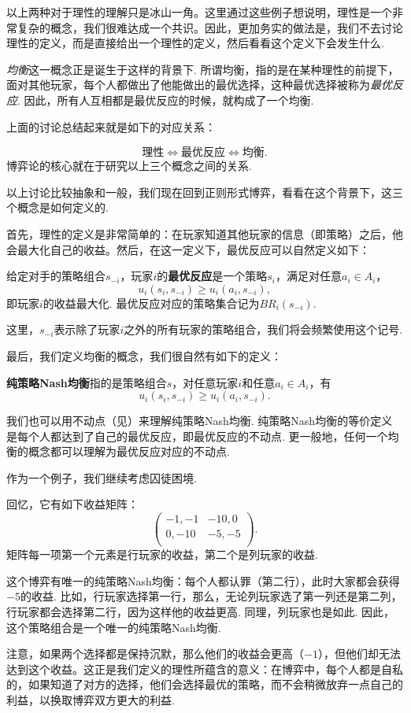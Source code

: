以上两种对于理性的理解只是冰山一角。这里通过这些例子想说明，理性是一个非常复杂的概念，我们很难达成一个共识。因此，更加务实的做法是，我们不去讨论理性的定义，而是直接给出一个理性的定义，然后看看这个定义下会发生什么.

\emph{均衡}这一概念正是诞生于这样的背景下. 所谓均衡，指的是在某种理性的前提下，面对其他玩家，每个人都做出了他能做出的最优选择，这种最优选择被称为\emph{最优反应}. 因此，所有人互相都是最优反应的时候，就构成了一个均衡.

上面的讨论总结起来就是如下的对应关系：

\[
\text{理性}\iff\text{最优反应}\iff\text{均衡}.
\]
博弈论的核心就在于研究以上三个概念之间的关系.

以上讨论比较抽象和一般，我们现在回到正则形式博弈，看看在这个背景下，这三个概念是如何定义的.

首先，理性的定义是非常简单的：在玩家知道其他玩家的信息（即策略）之后，他会最大化自己的收益。然后，在这一定义下，最优反应可以自然定义如下：

\begin{definition}[最优反应]
给定对手的策略组合$s_{-i}$，玩家$i$的\textbf{最优反应}是一个策略$s_i$，满足对任意$a_i\in A_i$，
    \[u_i(s_i,s_{-i})\geq u_i(a_i,s_{-i}),\]
即玩家$i$的收益最大化. 最优反应对应的策略集合记为$BR_i(s_{-i})$.
\end{definition}
这里，$s_{-i}$表示除了玩家$i$之外的所有玩家的策略组合，我们将会频繁使用这个记号.

最后，我们定义均衡的概念，我们很自然有如下的定义：

\begin{definition}[纯策略Nash均衡]
\textbf{纯策略Nash均衡}指的是策略组合$s$，对任意玩家$i$和任意$a_i\in A_i$，有
    \[u_i(s_i,s_{-i})\geq u_i(a_i,s_{-i}).\]
\end{definition}

我们也可以用不动点（见）来理解纯策略Nash均衡. 纯策略Nash均衡的等价定义是每个人都达到了自己的最优反应，即最优反应的不动点. 更一般地，任何一个均衡的概念都可以理解为最优反应对应的不动点.

作为一个例子，我们继续考虑囚徒困境.
\begin{example}[囚徒困境的纯策略Nash均衡]
回忆，它有如下收益矩阵：
\[
\begin{pmatrix}
-1,-1&-10,0\\
0,-10&-5,-5\\
\end{pmatrix}.
\]
矩阵每一项第一个元素是行玩家的收益，第二个是列玩家的收益. 

这个博弈有唯一的纯策略Nash均衡：每个人都认罪（第二行），此时大家都会获得$-5$的收益. 比如，行玩家选择第一行，那么，无论列玩家选了第一列还是第二列，行玩家都会选择第二行，因为这样他的收益更高. 同理，列玩家也是如此. 因此，这个策略组合是一个唯一的纯策略Nash均衡.

注意，如果两个选择都是保持沉默，那么他们的收益会更高（$-1$），但他们却无法达到这个收益。这正是我们定义的理性所蕴含的意义：在博弈中，每个人都是自私的，如果知道了对方的选择，他们会选择最优的策略，而不会稍微放弃一点自己的利益，以换取博弈双方更大的利益.
\end{example}

